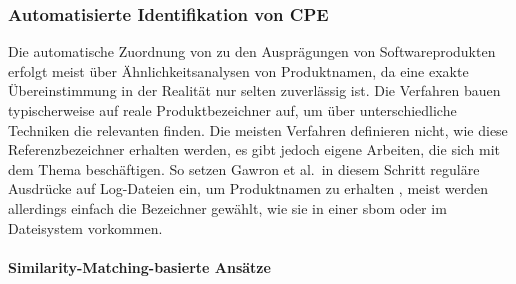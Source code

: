 
\subsubsection{Automatisierte Identifikation von CPE}

Die automatische Zuordnung von  zu den Ausprägungen von Softwareprodukten erfolgt meist über Ähnlichkeitsanalysen von Produktnamen, da eine exakte Übereinstimmung in der Realität nur selten zuverlässig ist.
Die Verfahren bauen typischerweise auf reale Produktbezeichner auf, um über unterschiedliche Techniken die relevanten  finden.
Die meisten Verfahren definieren nicht, wie diese Referenzbezeichner erhalten werden, es gibt jedoch eigene Arbeiten, die sich mit dem Thema beschäftigen.
So setzen Gawron et al.\ in diesem Schritt reguläre Ausdrücke auf Log-Dateien ein, um Produktnamen zu erhalten \autocite{Gawron2017}, meist werden allerdings einfach die Bezeichner gewählt, wie sie in einer \acrshort{sbom} oder im Dateisystem vorkommen.

\paragraph{Similarity-Matching-basierte Ansätze}

